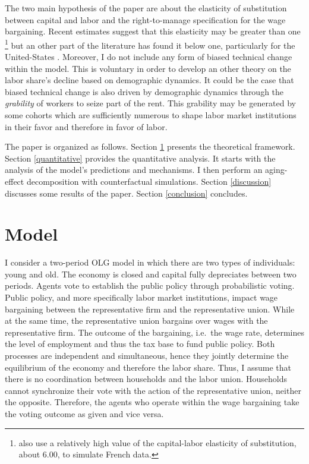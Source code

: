 \documentclass[
]{article}
\begin{document}
The two main hypothesis of the paper are about the elasticity of substitution between capital and labor and the right-to-manage specification for the wage bargaining. Recent estimates suggest that this elasticity may be greater than one \citep[see][]{Karabarbounis2014}\footnote{\citet{Caballero1998} also use a relatively high value of the capital-labor elasticity of substitution, about 6.00, to simulate French data.} but an other part of the literature has found it below one, particularly for the United-States \citep[see, for example,][]{Antras2004, Chirinko2008}.
Moreover, I do not include any form of biased technical change within the model. This is voluntary in order to develop an other theory on the labor share's decline based on demographic dynamics. It could be the case that biased technical change is also driven by demographic dynamics through the \emph{grability} of workers to seize part of the rent. This grability may be generated by some cohorts which are sufficiently numerous to shape labor market institutions in their favor and therefore in favor of labor.

The paper is organized as follows. Section \ref{model} presents the theoretical framework. Section \ref{quantitative} provides the quantitative analysis. It starts with the analysis of the model's predictions and mechanisms. I then perform an aging-effect decomposition with counterfactual simulations. Section \ref{discussion} discusses some results of the paper. Section \ref{conclusion} concludes.

\hypertarget{model}{%
\section{Model}\label{model}}

I consider a two-period OLG model in which there are two types of individuals: young and old. The economy is closed and capital fully depreciates between two periods.
Agents vote to establish the public policy through probabilistic voting. Public policy, and more specifically labor market institutions, impact wage bargaining between the representative firm and the representative union.
While at the same time, the representative union bargains over wages with the representative firm. The outcome of the bargaining, i.e.~the wage rate, determines the level of employment and thus the tax base to fund public policy.
Both processes are independent and simultaneous, hence they jointly determine the equilibrium of the economy and therefore the labor share.
Thus, I assume that there is no coordination between households and the labor union. Households cannot synchronize their vote with the action of the representative union, neither the opposite. Therefore, the agents who operate within the wage bargaining take the voting outcome as given and vice versa.
\end{document}
